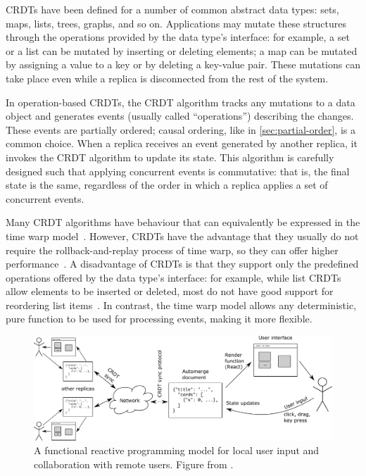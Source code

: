 \documentclass[sigconf,nonacm]{acmart}
\begin{document}
CRDTs have been defined for a number of common abstract data types: sets, maps, lists, trees, graphs, and so on.
Applications may mutate these structures through the operations provided by the data type's interface: for example, a set or a list can be mutated by inserting or deleting elements; a map can be mutated by assigning a value to a key or by deleting a key-value pair.
These mutations can take place even while a replica is disconnected from the rest of the system.

In operation-based CRDTs, the CRDT algorithm tracks any mutations to a data object and generates events (usually called ``operations'') describing the changes.
These events are partially ordered; causal ordering, like in \autoref{sec:partial-order}, is a common choice.
When a replica receives an event generated by another replica, it invokes the CRDT algorithm to update its state.
This algorithm is carefully designed such that applying concurrent events is commutative: that is, the final state is the same, regardless of the order in which a replica applies a set of concurrent events.

Many CRDT algorithms have behaviour that can equivalently be expressed in the time warp model~\cite{Kleppmann:2018}.
However, CRDTs have the advantage that they usually do not require the rollback-and-replay process of time warp, so they can offer higher performance~\cite{dePorre:2019}.
A disadvantage of CRDTs is that they support only the predefined operations offered by the data type's interface: for example, while list CRDTs allow elements to be inserted or deleted, most do not have good support for reordering list items~\cite{Kleppmann:2020}.
In contrast, the time warp model allows any deterministic, pure function to be used for processing events, making it more flexible.

\begin{figure}
\centering
\includegraphics{document-frp.pdf}
\caption{A functional reactive programming model for local user input and collaboration with remote users. Figure from \cite{vanHardenberg:2020}.}
\label{fig:pushpin}
\end{figure}
\end{document}
